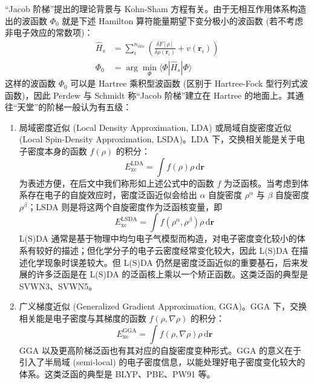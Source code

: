 “Jacob 阶梯”提出的理论背景与 Kohn-Sham 方程有关。由于无相互作用体系构造出的波函数 $\Phi_0$ 就是下述 Hamilton 算符能量期望下变分极小的波函数 (若不考虑非电子效应的常数项)：
\begin{align}
  \hat H_s &= \sum_i^{n_\mathrm{elec}} \left( \frac{\delta F[\rho]}{\delta \rho(\bm{r}_i)} + v(\bm{r}_i) \right) \\
  \Phi_0 &= \arg \min_{\Phi} \langle \Phi | \hat H_s | \Phi \rangle
\end{align}
这样的波函数 $\Phi_0$ 可以是 Hartree 乘积型波函数 (区别于 Hartree-Fock 型行列式波函数)，因此 Perdew 与 Schmidt 称“Jacob 阶梯”建立在 Hartree 的地面上。其通往“天堂”的阶梯一般认为有五级：
\begin{enumerate}[nosep]
  \item 局域密度近似 (Local Density Approximation, LDA) 或局域自旋密度近似 (Local Spin-Density Approximation, LSDA)。LDA 下，交换相关能是关于电子密度本身的函数 $f(\rho)$ 的积分：
  \begin{equation}
    E_\mathrm{xc}^\mathrm{LDA} = \int f(\rho) \rho \, \mathrm{d} \bm{r}
  \end{equation}
  为表述方便，在后文中我们称形如上述公式中的函数 $f$ 为泛函核。当考虑到体系存在电子的自旋效应时，密度泛函近似会给出 $\alpha$ 自旋密度 $\rho^\alpha$ 与 $\beta$ 自旋密度 $\rho^\beta$；LSDA 则是将这两个自旋密度作为泛函核变量，即
  \begin{equation}
    E_\mathrm{xc}^\mathrm{LSDA} = \int f(\rho^\alpha, \rho^\beta) \rho \, \mathrm{d} \bm{r}
  \end{equation}
  L(S)DA 通常是基于物理中均匀电子气模型而构造，对电子密度变化较小的体系有较好的描述；但化学分子的电子云密度经常变化较大，因此 L(S)DA 在描述化学现象时误差较大。但 L(S)DA 仍然是密度泛函近似的重要基石，后来发展的许多泛函是在 L(S)DA 的泛函核上乘以一个矫正函数。这类泛函的典型是 SVWN3\cite{Dirac-Dirac.MPCPS.1930, Bloch-Bloch.ZP.1929, Vosko-Nusair.CJP.1980}、SVWN5\cite{Dirac-Dirac.MPCPS.1930, Bloch-Bloch.ZP.1929, Vosko-Nusair.CJP.1980}。
  
  \item 广义梯度近似 (Generalized Gradient Approximation, GGA)。GGA 下，交换相关能是电子密度与其梯度的函数 $f(\rho, \nabla \rho)$ 的积分：
  \begin{equation}
    E_\mathrm{xc}^\mathrm{GGA} = \int f(\rho, \nabla \rho) \rho \, \mathrm{d} \bm{r}
  \end{equation}
  GGA 以及更高阶梯泛函也有其对应的自旋密度变种形式。GGA 的意义在于引入了半局域 (semi-local) 的电子密度信息，以能处理好电子密度变化较大的体系。这类泛函的典型是 BLYP\cite{Becke-Becke.PRA.1988, Lee-Parr.PRB.1988}、PBE\cite{Perdew-Ernzerhof.PRL.1996}、PW91\cite{Perdew-Fiolhais.PRB.1992} 等。


\end{enumerate}
